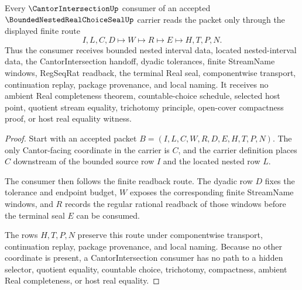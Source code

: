 \begin{theorem}
\label{thm:bounded-nested-real-choice-seal-cantor-handoff}
Every $\CantorIntersectionUp$ consumer of an accepted $\BoundedNestedRealChoiceSealUp$ carrier reads the packet only through the displayed finite route
$$
I,L,C,D \longmapsto W \longmapsto R \longmapsto E \longmapsto H,T,P,N .
$$
Thus the consumer receives bounded nested interval data, located nested-interval data, the CantorIntersection handoff, dyadic tolerances, finite StreamName windows, RegSeqRat readback, the terminal Real seal, componentwise transport, continuation replay, package provenance, and local naming. It receives no ambient Real completeness theorem, countable-choice schedule, selected host point, quotient stream equality, trichotomy principle, open-cover compactness proof, or host real equality witness.
\end{theorem}
\begin{proof}
Start with an accepted packet $B=(I,L,C,W,R,D,E,H,T,P,N)$. The only Cantor-facing coordinate in the carrier is $C$, and the carrier definition places $C$ downstream of the bounded source row $I$ and the located nested row $L$.

The consumer then follows the finite readback route. The dyadic row $D$ fixes the tolerance and endpoint budget, $W$ exposes the corresponding finite StreamName windows, and $R$ records the regular rational readback of those windows before the terminal seal $E$ can be consumed.

The rows $H,T,P,N$ preserve this route under componentwise transport, continuation replay, package provenance, and local naming. Because no other coordinate is present, a CantorIntersection consumer has no path to a hidden selector, quotient equality, countable choice, trichotomy, compactness, ambient Real completeness, or host real equality.
\end{proof}


